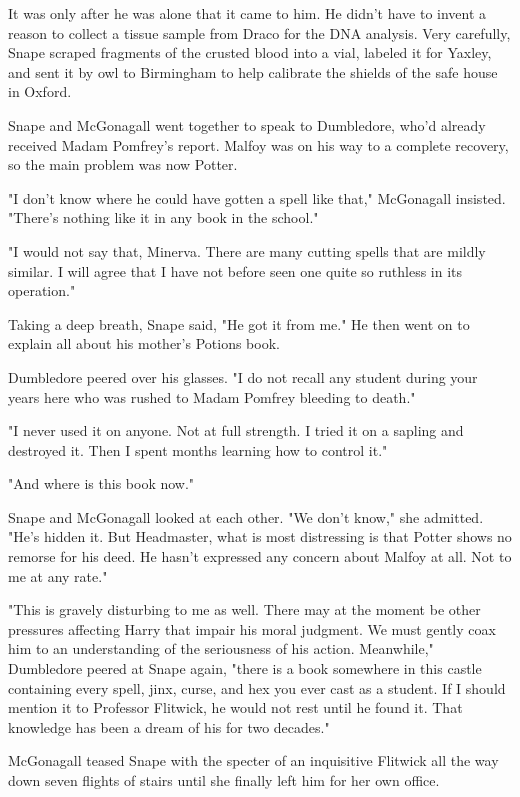 \documentclass[a4paper,11pt]{article}
\begin{document}
It was only after he was alone that it came to him. He didn't have to invent a reason to collect a tissue sample from Draco for the DNA analysis. Very carefully, Snape scraped fragments of the crusted blood into a vial, labeled it for Yaxley, and sent it by owl to Birmingham to help calibrate the shields of the safe house in Oxford.

Snape and McGonagall went together to speak to Dumbledore, who'd already received Madam Pomfrey's report. Malfoy was on his way to a complete recovery, so the main problem was now Potter.

"I don't know where he could have gotten a spell like that," McGonagall insisted. "There's nothing like it in any book in the school."

"I would not say that, Minerva. There are many cutting spells that are mildly similar. I will agree that I have not before seen one quite so ruthless in its operation."

Taking a deep breath, Snape said, "He got it from me." He then went on to explain all about his mother's Potions book.

Dumbledore peered over his glasses. "I do not recall any student during your years here who was rushed to Madam Pomfrey bleeding to death."

"I never used it on anyone. Not at full strength. I tried it on a sapling and destroyed it. Then I spent months learning how to control it."

"And where is this book now."

Snape and McGonagall looked at each other. "We don't know," she admitted. "He's hidden it. But Headmaster, what is most distressing is that Potter shows no remorse for his deed. He hasn't expressed any concern about Malfoy at all. Not to me at any rate."

"This is gravely disturbing to me as well. There may at the moment be other pressures affecting Harry that impair his moral judgment. We must gently coax him to an understanding of the seriousness of his action. Meanwhile," Dumbledore peered at Snape again, "there is a book somewhere in this castle containing every spell, jinx, curse, and hex you ever cast as a student. If I should mention it to Professor Flitwick, he would not rest until he found it. That knowledge has been a dream of his for two decades."

McGonagall teased Snape with the specter of an inquisitive Flitwick all the way down seven flights of stairs until she finally left him for her own office.
\end{document}
